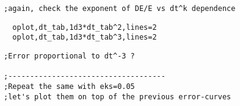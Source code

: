 \documentclass[a4paper,12pt]{article}
\def\red{\color{red}}
\def\black{\color{RGBblack}}
\begin{document}
\black
\begin{verbatim}
;again, check the exponent of DE/E vs dt^k dependence

\end{verbatim}
\red
\begin{verbatim}
  oplot,dt_tab,1d3*dt_tab^2,lines=2
  oplot,dt_tab,1d3*dt_tab^3,lines=2

\end{verbatim}
\black
\begin{verbatim}
;Error proportional to dt^-3 ?  

;------------------------------------
;Repeat the same with eks=0.05
;let's plot them on top of the previous error-curves

\end{verbatim}
\black
\end{document}
